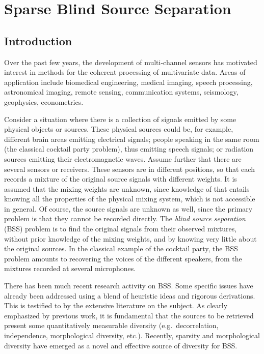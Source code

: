 
\chapter{Sparse Blind Source Separation}
\minitoc 

\label{ch_gmca}

     
\section{Introduction}

Over the past few years, the development of multi-channel sensors has motivated interest in methods for the coherent processing of multivariate data. Areas of application include biomedical engineering, medical imaging, speech processing, astronomical imaging, remote sensing, communication systems, seismology, geophysics, econometrics.

Consider a situation where there is a collection of signals emitted by some physical objects or sources. These physical sources could be, for example, different brain areas emitting electrical signals; people speaking in the same room (the classical cocktail party problem), thus emitting speech signals; or radiation sources emitting their electromagnetic waves. Assume further that there are several sensors or receivers. These sensors are in different positions, so that each records a mixture of the original source signals with different weights. It is assumed that the mixing weights are unknown, since knowledge of that entails knowing all the properties of the physical mixing system, which is not accessible in general. Of course, the source signals are unknown as well, since the primary problem is that they cannot be recorded directly. The {\textit{blind source separation}} (BSS) problem is to find the original signals from their observed mixtures, without prior knowledge of the mixing weights, and by knowing very little about the original sources. In the classical example of the cocktail party, the BSS problem amounts to recovering the voices of the different speakers, from the mixtures recorded at several microphones. 

There has been much recent research activity on BSS. Some specific issues have already been addressed using a blend of heuristic ideas and rigorous derivations. This is testified to by the extensive literature on the subject. As clearly emphasized by previous work, it is fundamental that the sources to be retrieved present some quantitatively measurable diversity (e.g.\ decorrelation, independence, morphological diversity, etc.). Recently, sparsity and morphological diversity have emerged as a novel and effective source of diversity for BSS. 

